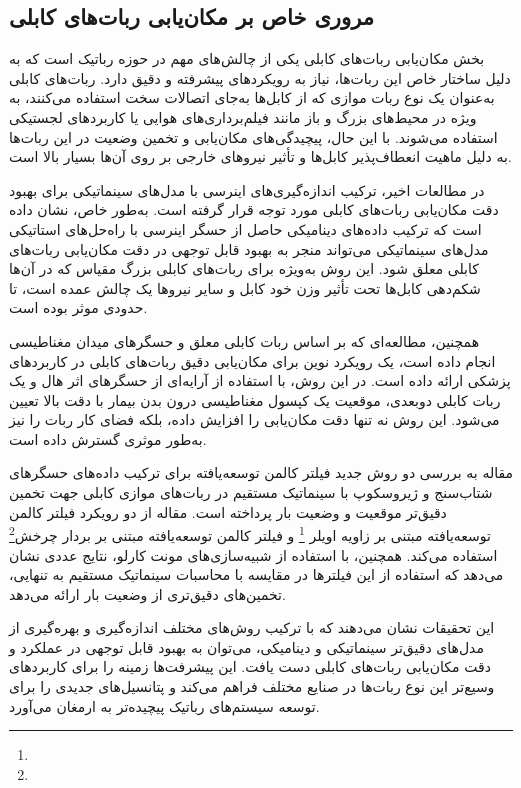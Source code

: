\subsection{مروری خاص بر مکان‌یابی ربات‌های کابلی}

بخش مکان‌یابی ربات‌های کابلی یکی از چالش‌های مهم در حوزه رباتیک است که به دلیل ساختار خاص این ربات‌ها، نیاز به رویکردهای پیشرفته و دقیق دارد. ربات‌های کابلی به‌عنوان یک نوع ربات موازی که از کابل‌ها به‌جای اتصالات سخت استفاده می‌کنند، به ویژه در محیط‌های بزرگ و باز مانند فیلم‌برداری‌های هوایی یا کاربردهای لجستیکی استفاده می‌شوند. با این حال، پیچیدگی‌های مکان‌یابی و تخمین وضعیت در این ربات‌ها به دلیل ماهیت انعطاف‌پذیر کابل‌ها و تأثیر نیروهای خارجی بر روی آن‌ها بسیار بالا است.

در مطالعات اخیر، ترکیب اندازه‌گیری‌های اینرسی با مدل‌های سینماتیکی برای بهبود دقت مکان‌یابی ربات‌های کابلی مورد توجه قرار گرفته است. به‌طور خاص، 
\cite{murtra2013imu}
نشان داده است که ترکیب داده‌های دینامیکی حاصل از حسگر اینرسی با راه‌حل‌های استاتیکی مدل‌های سینماتیکی می‌تواند منجر به بهبود قابل توجهی در دقت مکان‌یابی ربات‌های کابلی معلق شود. این روش به‌ویژه برای ربات‌های کابلی بزرگ مقیاس که در آن‌ها شکم‌دهی کابل‌ها تحت تأثیر وزن خود کابل و سایر نیروها یک چالش عمده است، تا حدودی موثر بوده است.

همچنین،
\cite{kim2020robotic}
مطالعه‌ای که بر اساس ربات کابلی معلق و حسگرهای میدان مغناطیسی انجام داده است، یک رویکرد نوین برای مکان‌یابی دقیق ربات‌های کابلی در کاربردهای پزشکی ارائه داده است. در این روش، با استفاده از آرایه‌ای از حسگرهای اثر هال و یک ربات کابلی دوبعدی، موقعیت یک کپسول مغناطیسی درون بدن بیمار با دقت بالا تعیین می‌شود. این روش نه تنها دقت مکان‌یابی را افزایش داده، بلکه فضای کار ربات را نیز به‌طور موثری گسترش داده است.

مقاله
\cite{le2021cable}
 به بررسی دو روش جدید فیلتر کالمن توسعه‌یافته برای ترکیب داده‌های حسگرهای شتاب‌سنج و ژیروسکوپ با سینماتیک مستقیم در ربات‌های موازی کابلی جهت تخمین دقیق‌تر موقعیت و وضعیت بار پرداخته است. مقاله از دو رویکرد فیلتر کالمن توسعه‌یافته مبتنی بر زاویه اویلر
 \footnote{}
  و فیلتر کالمن توسعه‌یافته مبتنی بر بردار چرخش\footnote{} استفاده می‌کند. همچنین، با استفاده از شبیه‌سازی‌های مونت کارلو، نتایج عددی نشان می‌دهد که استفاده از این فیلترها در مقایسه با محاسبات سینماتیک مستقیم به تنهایی، تخمین‌های دقیق‌تری از وضعیت بار ارائه می‌دهد.

این تحقیقات نشان می‌دهند که با ترکیب روش‌های مختلف اندازه‌گیری و بهره‌گیری از مدل‌های دقیق‌تر سینماتیکی و دینامیکی، می‌توان به بهبود قابل توجهی در عملکرد و دقت مکان‌یابی ربات‌های کابلی دست یافت. این پیشرفت‌ها زمینه را برای کاربردهای وسیع‌تر این نوع ربات‌ها در صنایع مختلف فراهم می‌کند و پتانسیل‌های جدیدی را برای توسعه سیستم‌های رباتیک پیچیده‌تر به ارمغان می‌آورد.

